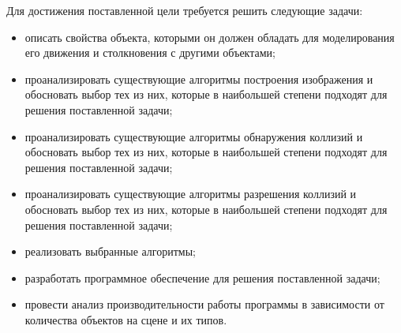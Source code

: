 Для достижения поставленной цели требуется решить следующие задачи:
\begin{itemize}
    \item описать свойства объекта, которыми он должен обладать для моделирования его движения и столкновения с другими объектами;
    \item проанализировать существующие алгоритмы построения изображения и обосновать выбор тех из них, которые в наибольшей степени подходят для решения поставленной задачи;
    \item проанализировать существующие алгоритмы обнаружения коллизий и обосновать выбор тех из них, которые в наибольшей степени подходят для решения поставленной задачи;
    \item проанализировать существующие алгоритмы разрешения коллизий и обосновать выбор тех из них, которые в наибольшей степени подходят для решения поставленной задачи;
    \item реализовать выбранные алгоритмы;
    \item разработать программное обеспечение для решения поставленной задачи;
    \item провести анализ производительности работы программы в зависимости от количества объектов на сцене и их типов.
\end{itemize}
